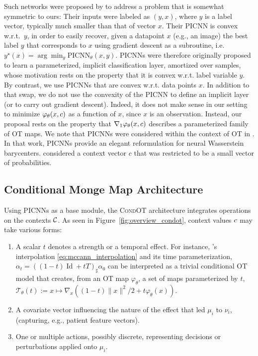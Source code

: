 Such networks were proposed by \citet[Eq. 3]{amos2017input} to address a problem that is somewhat symmetric to ours: Their inputs were labeled as $(y, x)$, where $y$ is a label vector, typically much smaller than that of vector $x$. Their PICNN is convex w.r.t.~$y$, in order to easily recover, given a datapoint $x$ (e.g., an image) the best label $y$ that corresponds to $x$ using gradient descent as a subroutine, i.e. $y^\star(x) = \arg\min_y \text{PICNN}_\theta(x,y)$. PICNNs were therefore originally proposed to learn a parameterized, implicit classification layer, amortized over samples, whose motivation rests on the property that it is convex w.r.t. label variable $y$. By contrast, we use PICNNs that are convex w.r.t. data points $x$. In addition to that swap, we do not use the convexity of the PICNN to define an implicit layer (or to carry out gradient descent). Indeed, it does not make sense in our setting to minimize $\varphi_\theta(x,c)$ as a function of $x$, since $x$ is an observation. Instead, our proposal rests on the property that $\nabla_1 \varphi_\theta(x,c)$ describes a parameterized family of OT maps. We note that PICNNs were considered within the context of OT in \cite[Appendix B]{fan2021scalable}. In that work, PICNNs provide an elegant reformulation for neural Wasserstein barycenters. \citet{fan2021scalable} considered a context vector $c$ that was restricted to be a small vector of probabilities.


\subsection{Conditional Monge Map Architecture}\label{subsec:combin}
Using PICNNs as a base module, the \textsc{CondOT} architecture integrates operations on the contexts ${\mathcal{C}}$. As seen in Figure~\ref{fig:overview_condot}, context values $c$ may take various forms:
\begin{enumerate}[noitemsep,leftmargin=.35cm,topsep=0pt,parsep=0pt,partopsep=0pt]
\item A scalar $t$ denotes a strength or a temporal effect. For instance, \citeauthor{mccann1997convexity}'s interpolation \eqref{eq:mccann_interpolation} and its time parameterization, $\alpha_{t}=((1-t) \operatorname{Id}+t T)_{\sharp} \alpha_{0}$ \citep{mccann1997convexity} can be interpreted as a trivial conditional OT model that creates, from an OT map $\varphi_\theta$, a set of maps parameterized by $t$, $\mathcal{T}_\theta(t):=x\mapsto\nabla_x \left((1-t)\|x\|^2/2 +t \varphi_\theta(x)\right)$.
\item A covariate vector influencing the nature of the effect that led $\mu_i$ to $\nu_i$, (capturing, e.g., patient feature vectors).
\item One or multiple actions, possibly discrete, representing decisions or perturbations applied onto $\mu_i$. \\
\end{enumerate}

